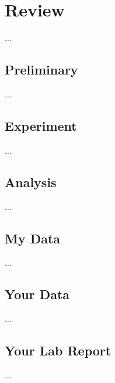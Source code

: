 \chapter{Review}
...
\section{Preliminary}
...
\section{Experiment}
...
\section{Analysis}
...
\section{My Data}
...
\section{Your Data}
...
\section{Your Lab Report}
...